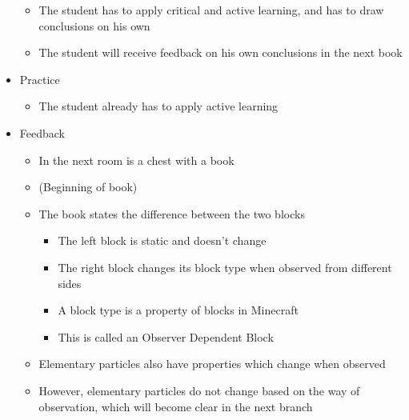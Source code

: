 \documentclass[11pt,twoside]{report} %
\begin{document}
\begin{itemize}
\begin{itemize}
			\item The student has to apply critical and active learning, and has to draw conclusions on his own
			\item The student will receive feedback on his own conclusions in the next book
		\end{itemize}
		\item Practice
		\begin{itemize}
			\item The student already has to apply active learning
		\end{itemize}
		\item Feedback
		\begin{itemize}
			\item In the next room is a chest with a book
			\item (Beginning of book)
			\item The book states the difference between the two blocks
			\begin{itemize}
				\item The left block is static and doesn't change
				\item The right block changes its block type when observed from different sides
				\item A block type is a property of blocks in Minecraft
				\item This is called an Observer Dependent Block
			\end{itemize}
			\item Elementary particles also have properties which change when observed
			\item However, elementary particles do not change based on the way of observation, which will become clear in the next branch
		\end{itemize}
	\end{itemize}
\end{document}
